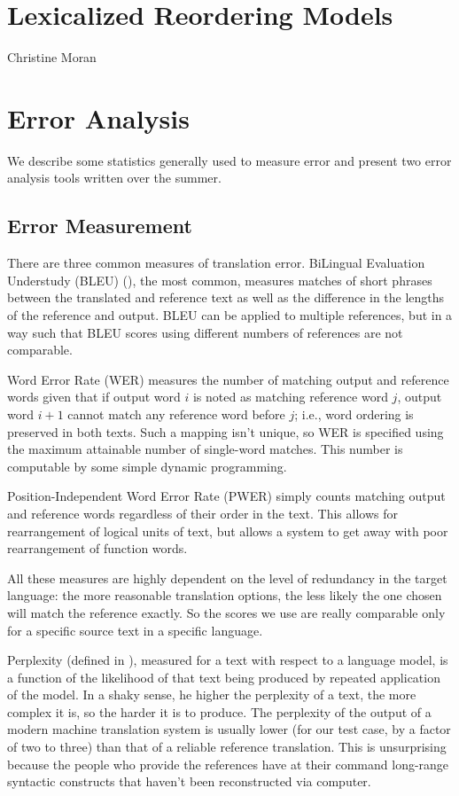 \documentclass[11pt]{report}
\theoremstyle{plain}
\begin{document}
{\section{Lexicalized Reordering Models}
{\sc Christine Moran}

\section{Error Analysis}
We describe some statistics generally used to measure error and present two error analysis tools written over the summer.

\subsection{Error Measurement}
There are three common measures of translation error. BiLingual Evaluation Understudy (BLEU) (\cite{bleu}), the most common, measures matches of short phrases between the translated and reference text as well as the difference in the lengths of the reference and output. BLEU can be applied to multiple references, but in a way such that BLEU scores using different numbers of references are not comparable.

Word Error Rate (WER) measures the number of matching output and reference words given that if output word $i$ is noted as matching reference word $j$, output word $i + 1$ cannot match any reference word before $j$; i.e., word ordering is preserved in both texts. Such a mapping isn't unique, so WER is specified using the maximum attainable number of single-word matches. This number is computable by some simple dynamic programming.

Position-Independent Word Error Rate (PWER) simply counts matching output and reference words regardless of their order in the text. This allows for rearrangement of logical units of text, but allows a system to get away with poor rearrangement of function words.

All these measures are highly dependent on the level of redundancy in the target language: the more reasonable translation options, the less likely the one chosen will match the reference exactly. So the scores we use are really comparable only for a specific source text in a specific language.

Perplexity (defined in \cite{perplexity}), measured for a text with respect to a language model, is a function of the likelihood of that text being produced by repeated application of the model. In a shaky sense, he higher the perplexity of a text, the more complex it is, so the harder it is to produce. The perplexity of the output of a modern machine translation system is usually lower (for our test case, by a factor of two to three) than that of a reliable reference translation. This is unsurprising because the people who provide the references have at their command long-range syntactic constructs that haven't been reconstructed via computer.

}
\end{document}
